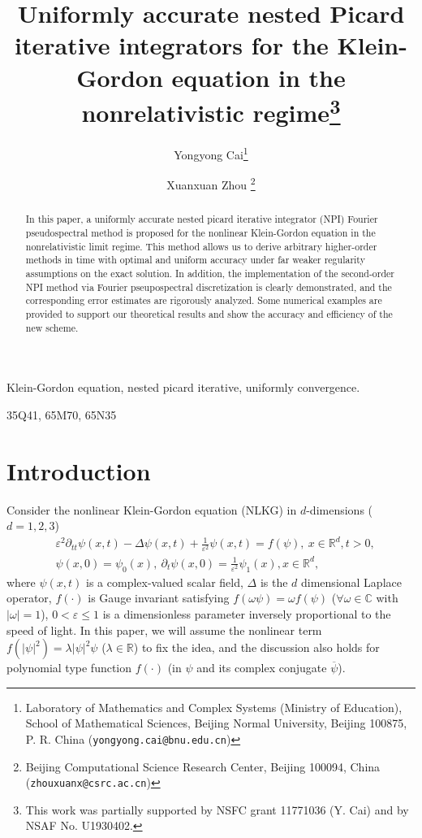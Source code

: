 \documentclass[final,leqno,showlabe]{siamltex}
\title{Uniformly accurate nested Picard iterative integrators for the Klein-Gordon equation in the nonrelativistic regime\thanks{This work was partially supported by NSFC grant 11771036 (Y. Cai) and by NSAF No. U1930402.}
}
\author{ Yongyong Cai\thanks{Laboratory of Mathematics and Complex Systems (Ministry of Education), School of Mathematical Sciences, Beijing Normal University, Beijing 100875, P. R. China
 ({\tt yongyong.cai@bnu.edu.cn})}
\and Xuanxuan Zhou \thanks{Beijing Computational Science Research Center,
   Beijing 100094, China ({\tt zhouxuanx@csrc.ac.cn})}
}
\date{}
\begin{document}
\maketitle

\begin{abstract}
  In this paper, a uniformly accurate nested picard iterative integrator (NPI) Fourier pseudospectral method is proposed for the nonlinear Klein-Gordon equation in the nonrelativistic limit regime. This method allows us to derive arbitrary higher-order methods in time with optimal and uniform accuracy under far weaker regularity assumptions on the exact solution. In addition, the implementation of the second-order NPI method via Fourier pseupospectral discretization is clearly demonstrated, and the corresponding error estimates are rigorously analyzed. Some numerical examples are provided to support our theoretical results and show the accuracy and efficiency of the new scheme.
\end{abstract}

\begin{keywords}
  Klein-Gordon equation, nested picard iterative, uniformly convergence.
\end{keywords}

\begin{AMS}
  35Q41, 65M70, 65N35
\end{AMS}

\section{Introduction}
Consider the nonlinear Klein-Gordon equation \cite{Limitkg,Kg-S,Ado:1996,Cauchy:1,Exact:1992,2Dkg:2006,Comparison:2019bao,Exponential:2010,Cohen:2003,Symmetric:2018,Lowre:2018} (NLKG) in $d$-dimensions ($d=1,2,3$)
\begin{equation}\label{problem}
\begin{split}
&\varepsilon^2\partial_{tt}\psi(x,t)-\Delta\psi(x,t)+\frac{1}{\varepsilon^2}\psi(x,t)=f(\psi),\ x\in \mathbb{R}^d, t>0, \\
&\psi(x,0)=\psi_0(x),\ \partial_t\psi(x,0)=\frac{1}{\varepsilon^2}\psi_1(x), x\in \mathbb{R}^d,
\end{split}
\end{equation}
where $\psi(x,t)$ is a complex-valued scalar field, $\Delta$ is the $d$ dimensional Laplace operator, $f(\cdot)$ is Gauge invariant  satisfying $f(\omega \psi)=\omega f(\psi)$ ($\forall \omega\in\mathbb{C}$ with $|\omega|=1$), $0<\varepsilon\leq 1$ is a dimensionless parameter inversely proportional to the speed of  light. In this paper, we will assume the nonlinear term $f(|\psi|^2)=\lambda|\psi|^2\psi$  ($\lambda\in \mathbb{R}$) to fix the idea, and the discussion also holds for polynomial type function $f(\cdot)$ (in $\psi$ and its complex conjugate $\overline{\psi}$).
\end{document}
